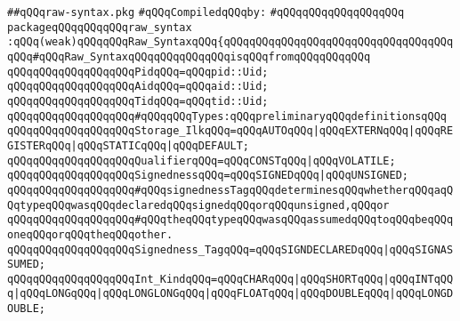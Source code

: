 \label{src/lib/c-kit/src/ast/raw-syntax.pkg}
\verb|##qQQqraw-syntax.pkg|\newline
\newline
\verb|#qQQqCompiledqQQqby:|\newline
\verb|#qQQqqQQqqQQqqQQqqQQq|\newline
\newline
\verb|packageqQQqqQQqqQQqraw_syntax|\newline
\verb|:qQQq(weak)qQQqqQQqRaw_SyntaxqQQq{qQQqqQQqqQQqqQQqqQQqqQQqqQQqqQQqqQQqqQQq#qQQqRaw_SyntaxqQQqqQQqqQQqqQQqisqQQqfromqQQqqQQqqQQq|\newline
\newline
\verb|qQQqqQQqqQQqqQQqqQQqPidqQQq=qQQqpid::Uid;|\newline
\verb|qQQqqQQqqQQqqQQqqQQqAidqQQq=qQQqaid::Uid;|\newline
\verb|qQQqqQQqqQQqqQQqqQQqTidqQQq=qQQqtid::Uid;|\newline
\newline
\verb|qQQqqQQqqQQqqQQqqQQq#qQQqqQQqTypes:qQQqpreliminaryqQQqdefinitionsqQQq|\newline
\verb|qQQqqQQqqQQqqQQqqQQqStorage_IlkqQQq=qQQqAUTOqQQq|\verb#|qQQqEXTERNqQQq|qQQqREGISTERqQQq|qQQqSTATICqQQq|qQQqDEFAULT;#\newline
\newline
\verb|qQQqqQQqqQQqqQQqqQQqQualifierqQQq=qQQqCONSTqQQq|\verb#|qQQqVOLATILE;#\newline
\newline
\verb|qQQqqQQqqQQqqQQqqQQqSignednessqQQq=qQQqSIGNEDqQQq|\verb#|qQQqUNSIGNED;#\newline
\newline
\verb|qQQqqQQqqQQqqQQqqQQq#qQQqsignednessTagqQQqdeterminesqQQqwhetherqQQqaqQQqtypeqQQqwasqQQqdeclaredqQQqsignedqQQqorqQQqunsigned,qQQqor|\newline
\verb|qQQqqQQqqQQqqQQqqQQq#qQQqtheqQQqtypeqQQqwasqQQqassumedqQQqtoqQQqbeqQQqoneqQQqorqQQqtheqQQqother.|\newline
\verb|qQQqqQQqqQQqqQQqqQQqSignedness_TagqQQq=qQQqSIGNDECLAREDqQQq|\verb#|qQQqSIGNASSUMED;#\newline
\newline
\verb|qQQqqQQqqQQqqQQqqQQqInt_KindqQQq=qQQqCHARqQQq|\verb#|qQQqSHORTqQQq|qQQqINTqQQq|qQQqLONGqQQq|qQQqLONGLONGqQQq|qQQqFLOATqQQq|qQQqDOUBLEqQQq|qQQqLONGDOUBLE;#\newline
